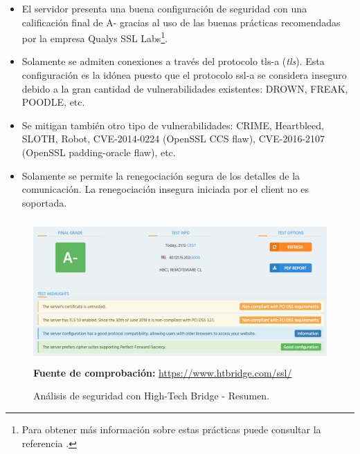 \documentclass[12pt,a4paper, twoside]{report}
\begin{document}
	\begin{itemize}
		\item El servidor presenta una buena configuración de seguridad con una calificación final de A- gracias al uso de las buenas prácticas recomendadas por la empresa Qualys SSL Labs\footnote{Para obtener más información sobre estas prácticas puede consultar la referencia \cite{ssllabs:best}.}.
		\item Solamente se admiten conexiones a través del protocolo \gls{tls-a} (\textit{\gls{tls}}). Esta configuración es la idónea puesto que el protocolo \gls{ssl-a} se considera inseguro debido a la gran cantidad de vulnerabilidades existentes: DROWN, FREAK, POODLE, etc.
		\item Se mitigan también otro tipo de vulnerabilidades: CRIME, Heartbleed, SLOTH, Robot, CVE-2014-0224 (OpenSSL CCS flaw), CVE-2016-2107 (OpenSSL padding-oracle flaw), etc.
		\item Solamente se permite la renegociación segura de los detalles de la comunicación. La renegociación insegura iniciada por el client no es soportada.
	\end{itemize}
					
	\begin{figure}[!ht]   
		\caption{Análisis de seguridad con High-Tech Bridge - Resumen.} 
		
		\begin{center} 
 			\includegraphics[width=15cm,height=5.5cm]{Images/implement/htbridge1} \\
			\label{fig:htbridge1} 
			\textbf{Fuente de comprobación:} \url{https://www.htbridge.com/ssl/}
		\end{center}  
	\end{figure}	
		
\end{document}
